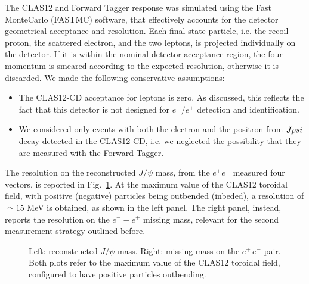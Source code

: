 \documentclass[a4paper,10pt]{article}
\begin{document}
The CLAS12 and Forward Tagger response was simulated using the Fast MonteCarlo (FASTMC) software, that effectively accounts for the detector geometrical acceptance and resolution. Each final state particle, i.e. the recoil
proton, the scattered electron, and the two leptons, is projected individually on the detector. If it is within the nominal detector acceptance region, the four-momentum is smeared according to the expected resolution, otherwise it is discarded. We made the following conservative assumptions:
\begin{itemize}
\item{The CLAS12-CD acceptance for leptons is zero. As discussed, this reflects the fact that this detector is not designed for $e^- / e^+$ detection and identification.}
\item{We considered only events with both the electron and the positron from $J\/psi$ decay detected in the CLAS12-CD, i.e. we neglected the possibility that they are measured with the Forward Tagger.}
\end{itemize}

The resolution on the reconstructed $J/\psi$ mass, from the $e^{+} e^{-}$ measured four vectors, is reported in Fig.~\ref{fig:3}. At the maximum value of the CLAS12 toroidal field, with positive (negative) particles being outbended (inbeded), a resolution of $\simeq 15$ MeV is obtained, as shown in the left panel. The right panel, instead, reports the resolution on the $e^- - e^+$ missing mass, relevant for the second measurement strategy outlined before.

\begin{figure}[tpb]
\caption{\footnotesize \label{fig:3} Left: reconstructed $J/\psi$ mass. Right: missing mass on the $e^+\,e^-$ pair. Both plots refer to the maximum value of the CLAS12 toroidal field, configured to have positive particles outbending.}
\end{figure}
\end{document}
